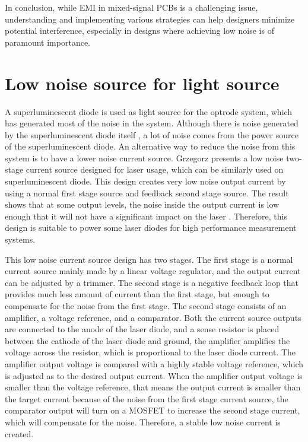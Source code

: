In conclusion, while EMI in mixed-signal PCBs is a challenging issue, understanding and implementing various strategies can help designers minimize potential interference, especially in designs where achieving low noise is of paramount importance.


\section{Low noise source for light source}

A superluminescent diode is used as light source for the optrode system, which has generated most of the noise in the system.  Although there is noise generated by the superluminescent diode itself \cite{SLDNoise}, a lot of noise comes from the power source of the superluminescent diode.  An alternative way to reduce the noise from this system is to have a lower noise current source.  Grzegorz \cite{LowNoiseCurrentSource} presents a low noise two-stage current source designed for laser usage, which can be similarly used on superluminescent diode.  This design creates very low noise output current by using a normal first stage source and feedback second stage source.  The result shows that at some output levels, the noise inside the output current is low enough that it will not have a significant impact on the laser \cite{LinewidthQuantumCascadeLaser}.  Therefore, this design is suitable to power some laser diodes for high performance measurement systems.

This low noise current source design has two stages.  The first stage is a normal current source mainly made by a linear voltage regulator, and the output current can be adjusted by a trimmer.  The second stage is a negative feedback loop that provides much less amount of current than the first stage, but enough to compensate for the noise from the first stage.  The second stage consists of an amplifier, a voltage reference, and a comparator.  Both the current source outputs are connected to the anode of the laser diode, and a sense resistor is placed between the cathode of the laser diode and ground, the amplifier amplifies the voltage across the resistor, which is proportional to the laser diode current.  The amplifier output voltage is compared with a highly stable voltage reference, which is adjusted as to the desired output current.  When the amplifier output voltage is smaller than the voltage reference, that means the output current is smaller than the target current because of the noise from the first stage current source, the comparator output will turn on a MOSFET to increase the second stage current, which will compensate for the noise.  Therefore, a stable low noise current is created.

